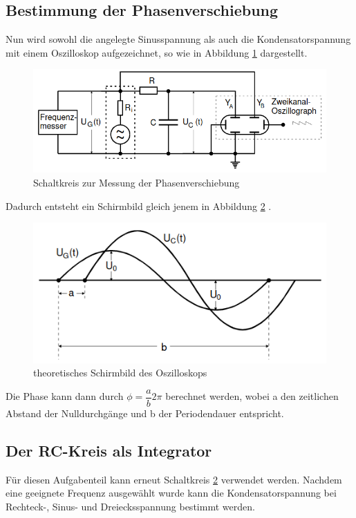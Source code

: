 \subsection{Bestimmung der Phasenverschiebung}
    Nun wird sowohl die angelegte Sinusspannung als auch die Kondensatorspannung mit einem
    Oszilloskop aufgezeichnet, so wie in Abbildung \ref{fig:schalt1} dargestellt. 
    \begin{figure}
        \centering
        \includegraphics{schalt1.png}
        \caption{Schaltkreis zur Messung der Phasenverschiebung}
        \label{fig:schalt1}
    \end{figure}
    Dadurch entsteht ein 
    Schirmbild gleich jenem in Abbildung \ref{fig:sinus} . 
    \begin{figure}
        \centering
        \includegraphics{sinus.png}
        \caption{theoretisches Schirmbild des Oszilloskops}
        \label{fig:sinus}
    \end{figure}
    Die Phase kann dann durch $\phi = \dfrac{a}{b} 2\pi$
    berechnet werden, wobei a den zeitlichen Abstand der Nulldurchgänge und b der Periodendauer
    entspricht.

\subsection{Der RC-Kreis als Integrator}
    Für diesen Aufgabenteil kann erneut Schaltkreis \ref{fig:sinus} verwendet werden. Nachdem  eine geeignete
    Frequenz ausgewählt wurde kann die Kondensatorspannung bei Rechteck-, Sinus- und Dreiecksspannung
    bestimmt werden.
